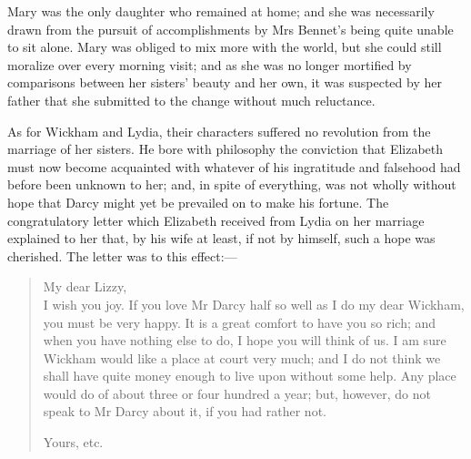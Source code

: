 Mary was the only daughter who remained at home; and she was necessarily drawn from the pursuit of accomplishments by Mrs Bennet's being quite unable to sit alone. Mary was obliged to mix more with the world, but she could still moralize over every morning visit; and as she was no longer mortified by comparisons between her sisters' beauty and her own, it was suspected by her father that she submitted to the change without much reluctance.

As for Wickham and Lydia, their characters suffered no revolution from the marriage of her sisters. He bore with philosophy the conviction that Elizabeth must now become acquainted with whatever of his ingratitude and falsehood had before been unknown to her; and, in spite of everything, was not wholly without hope that Darcy might yet be prevailed on to make his fortune. The congratulatory letter which Elizabeth received from Lydia on her marriage explained to her that, by his wife at least, if not by himself, such a hope was cherished. The letter was to this effect:—

\begin{quotation}
\noindent My dear Lizzy,
~\\
\indent I wish you joy. If you love Mr Darcy half so well as I do my dear Wickham, you must be very happy. It is a great comfort to have you so rich; and when you have nothing else to do, I hope you will think of us. I am sure Wickham would like a place at court very much; and I do not think we shall have quite money enough to live upon without some help. Any place would do of about three or four hundred a year; but, however, do not speak to Mr Darcy about it, if you had rather not.
\begin{flushright}
Yours, etc.
\end{flushright}
\end{quotation}

